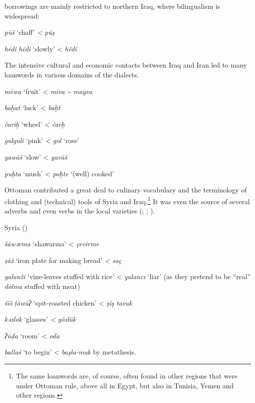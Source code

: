 \documentclass[output=paper]{langsci/langscibook}
\begin{document}
 borrowings are mainly restricted to northern Iraq, where {bilingualism} is widespread: 
\ea
{}

\textit{pūš} ‘chaff’ \textit{<}  \textit{pûş}

\textit{hēdi} \textit{hēdi} ‘slowly’ <  \textit{hêdî} \citep[68]{Jastrow1979}
\z

The {intensive} cultural and economic contacts between Iraq and Iran led to many  {loanwords} in various domains of the  dialects. 

\ea
\textit{mēwa} ‘fruit’ <  \textit{mīva} \textit{{\textasciitilde} mayva}

\textit{baḫat} ‘luck’ <  \textit{baḫt}

\textit{čariḫ} ‘wheel’ \textit{<}  \textit{čarḫ} 

\textit{gulguli} ‘pink’ \textit{<}  \textit{gol} ‘rose’

\textit{yawāš} ‘slow’ <  \textit{yavāš}

\textit{puḫta} ‘mush’ <  \textit{poḫte} ‘(well) cooked’
\z

Ottoman  contributed a great deal to culinary vocabulary and the terminology of clothing and (technical) tools of Syria and Iraq.\footnote{The same {loanwords} are, of course, often found in other regions that were under Ottoman rule, above all in Egypt, but also in Tunisia, {Yemen} and other regions.} It was even the source of several adverbs and even verbs in the local  varieties (\citealt{Halasi-Kun1969}; \citeyear{Halasi-Kun1973}; \citeyear{Halasi-Kun1982}).

\ea
Syria ()

\textit{šāwərma} ‘shawarma’ <  \textit{çevirme} 

\textit{ṣāž} ‘iron plate for making bread’ \textit{<}  \textit{saç}

\textit{yalanži} ‘vine-leaves stuffed with rice’ <  \textit{yalancı} ‘liar’ (as they pretend to be “real” \textit{dolma} stuffed with meat)

\textit{šīš} \textit{ṭāwūʔ} ‘spit-roasted chicken’ <  \textit{şiş} \textit{tavuk}

\textit{kǝzlok} ‘glasses’ \textit{<}  \textit{gözlük}

\textit{ʔūḍa} ‘room’ <  \textit{oda}

\textit{ballaš} ‘to begin’ <  \textit{başla-mak} by metathesis.
\z
\end{document}
